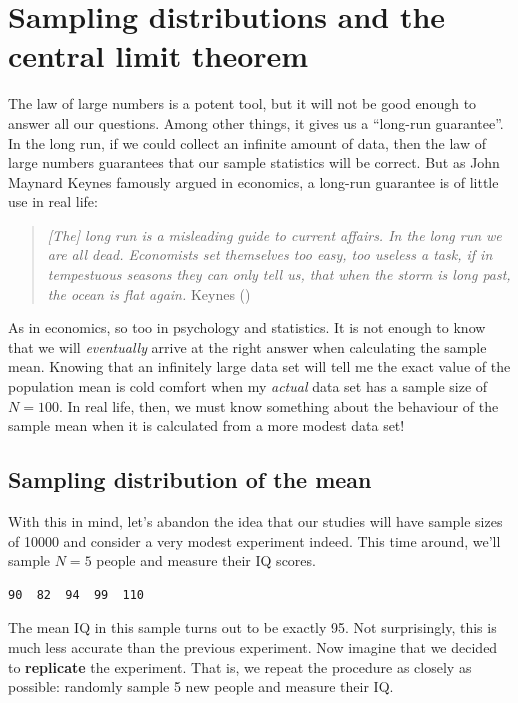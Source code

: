 \documentclass[
  11pt,
  a4paper,
  twoside,symmetric,openright]{book}
\theoremstyle{break}
\theoremstyle{break}
\begin{document}
\section{Sampling distributions and the central limit theorem}\label{samplesandclt}

The law of large numbers is a potent tool, but it will not be good enough to answer all our questions. Among other things, it gives us a ``long-run guarantee''. In the long run, if we could collect an infinite amount of data, then the law of large numbers guarantees that our sample statistics will be correct. But as John Maynard Keynes famously argued in economics, a long-run guarantee is of little use in real life:

\begin{quote}
\emph{{[}The{]} long run is a misleading guide to current affairs. In the long run we are all dead. Economists set themselves too easy, too useless a task, if in tempestuous seasons they can only tell us, that when the storm is long past, the ocean is flat again.} Keynes ()
\end{quote}

As in economics, so too in psychology and statistics. It is not enough to know that we will \emph{eventually} arrive at the right answer when calculating the sample mean. Knowing that an infinitely large data set will tell me the exact value of the population mean is cold comfort when my \emph{actual} data set has a sample size of \(N=100\). In real life, then, we must know something about the behaviour of the sample mean when it is calculated from a more modest data set!

\subsection{Sampling distribution of the mean}\label{samplingdists}

With this in mind, let's abandon the idea that our studies will have sample sizes of 10000 and consider a very modest experiment indeed. This time around, we'll sample \(N=5\) people and measure their IQ scores.

\begin{verbatim}
90  82  94  99  110
\end{verbatim}

The mean IQ in this sample turns out to be exactly 95. Not surprisingly, this is much less accurate than the previous experiment. Now imagine that we decided to \textbf{replicate} the experiment. That is, we repeat the procedure as closely as possible: randomly sample 5 new people and measure their IQ.
\end{document}
